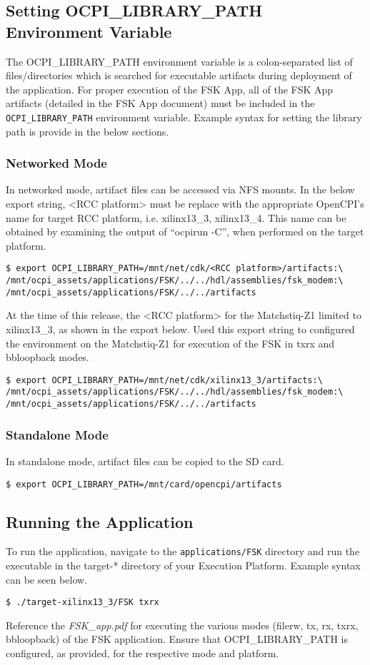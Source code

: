 \begin{flushleft}
\subsection{Setting OCPI\_LIBRARY\_PATH Environment Variable}
The OCPI\_LIBRARY\_PATH environment variable is a colon-separated list of files/directories which is searched for executable artifacts during deployment of the application. For proper execution of the FSK App, all of the FSK App artifacts (detailed in the FSK App document) must be included in the \texttt{OCPI\_LIBRARY\_PATH} environment variable. Example syntax for setting the library path is provide in the below sections.
\subsubsection{Networked Mode}
In networked mode, artifact files can be accessed via NFS mounts. In the below export string, <RCC platform> must be replace with the appropriate OpenCPI's name for target RCC platform, i.e. xilinx13\_3, xilinx13\_4. This name can be obtained by examining the output of ``ocpirun -C'', when performed on the target platform.
\begin{verbatim}
$ export OCPI_LIBRARY_PATH=/mnt/net/cdk/<RCC platform>/artifacts:\
/mnt/ocpi_assets/applications/FSK/../../hdl/assemblies/fsk_modem:\
/mnt/ocpi_assets/applications/FSK/../../artifacts
\end{verbatim}

At the time of this release, the <RCC platform> for the Matchstiq-Z1 limited to xilinx13\_3, as shown in the export below. Used this export string to configured the environment on the Matchstiq-Z1 for execution of the FSK in txrx and bbloopback modes.
\begin{verbatim}
$ export OCPI_LIBRARY_PATH=/mnt/net/cdk/xilinx13_3/artifacts:\
/mnt/ocpi_assets/applications/FSK/../../hdl/assemblies/fsk_modem:\
/mnt/ocpi_assets/applications/FSK/../../artifacts
\end{verbatim}


\subsubsection{Standalone Mode}
In standalone mode, artifact files can be copied to the SD card.
\begin{verbatim}
$ export OCPI_LIBRARY_PATH=/mnt/card/opencpi/artifacts
\end{verbatim}
\subsection{Running the Application}
To run the application, navigate to the \texttt{applications/FSK} directory and run the executable in the target-* directory of your Execution Platform. Example syntax can be seen below.
\begin{verbatim}
$ ./target-xilinx13_3/FSK txrx
\end{verbatim}
Reference the \textit{FSK\_app.pdf} for executing the various modes (filerw, tx, rx, txrx, bbloopback) of the FSK application. Ensure that OCPI\_LIBRARY\_PATH is configured, as provided, for the respective mode and platform. \\ \medskip


\end{flushleft}
